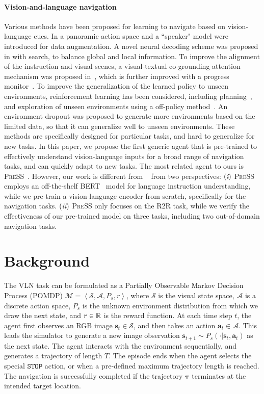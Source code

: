 \documentclass[10pt,twocolumn,letterpaper]{article}
\newcommand{\RN}[1]{\textup{\lowercase\expandafter{\it \romannumeral#1}}}
\newcommand{\av}{{\boldsymbol{a}}}
\newcommand{\sv}{{\boldsymbol{s}}}
\newcommand{\tauv}[0]{{\boldsymbol{\tau}}}
\newcommand{\Acal}{\mathcal{A}}
\newcommand{\Mcal}{\mathcal{M}}
\newcommand{\Scal}{\mathcal{S}}
\begin{document}
\paragraph{Vision-and-language navigation} Various methods have been proposed for learning to navigate based on vision-language cues. In \cite{fried2018speaker} a panoramic action space and a ``speaker" model were introduced for data augmentation. 
A novel neural decoding scheme was proposed in \cite{ke2019tactical} with search, to balance global and local information. 
To improve the alignment of the instruction and visual scenes, a visual-textual co-grounding attention mechanism was proposed in~\cite{ma2019self}, which is further improved with a progress monitor~\cite{ma2019regretful}. To improve the generalization of the learned policy to unseen environments, reinforcement learning has been considered, including planning~\cite{wang2018look}, and exploration of unseen environments using a off-policy method~\cite{wang2018reinforced}. An environment dropout was proposed \cite{tan2019learning} to generate more environments based on the limited data, so that it can generalize well to unseen environments. These methods are specifically designed for particular tasks, and hard to generalize for new tasks. In this paper, we propose the first generic agent that is pre-trained to effectively understand vision-language inputs for a broad range of navigation tasks, and can quickly adapt to new tasks. The most related agent to ours is \textsc{PreSS}~\cite{li2019robust}. However, our work is different from ~\cite{li2019robust} from two perspectives: 
$(\RN{1})$ \textsc{PreSS} employs an off-the-shelf BERT~\cite{devlin2018bert} model for language instruction understanding, while we pre-train a vision-language encoder from scratch, specifically for the navigation tasks.
$(\RN{2})$ \textsc{PreSS} only focuses on the R2R task, while we verify the effectiveness of our pre-trained model on three tasks, including two out-of-domain navigation tasks.


\vspace{-1mm}
\section{Background}
The VLN task can be formulated as a Partially Observable Markov Decision Process (POMDP) $\Mcal = \left \langle \Scal, \Acal, P_s, r \right \rangle$, where $\Scal$ is the visual state space, $\Acal$ is a discrete action space, $P_s$ is the unknown environment distribution from which we draw the next state, and $r \in \operatorname{\mathbb{R}}$ is the reward function. At each time step $t$, the agent first observes an RGB image $\sv_t \in \Scal$, and then takes an action $\av_t \in \Acal$. This leads the simulator to generate a new image observation $\sv_{t+1} \sim P_s(\cdot|\sv_t,\av_t)$ as the next state. 
The agent interacts with the environment sequentially, and generates a trajectory of length $T$. 
The episode ends when the agent selects the special $\mathtt{STOP}$ action, or when a pre-defined maximum trajectory length is reached. The navigation is successfully completed if the trajectory $\tauv$ terminates at the intended target location. 
\end{document}
